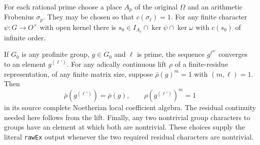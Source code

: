 \begin{proposition}
\label{prop:ax-choices}
For each rational prime choose a place $A_p$ of the original
$\Omega$ and an arithmetic Frobenius $\sigma_p$.  They may be
chosen so that $c(\sigma_\ell)=1$.  For any finite character
$\psi:G\to O^\times$ with open kernel there is
$s_0\in I_{A_\ell}\cap\ker\psi\cap\ker\omega$
with $c(s_0)$ of infinite order.

If $G_0$ is any profinite group, $g\in G_0$ and $\ell$ is prime,
the sequence $g^{\ell^{n!}}$ converges to an element $g^{(\ell')}$.
For any adically continuous lift $\rho$ of a finite-residue
representation, of any finite matrix size, suppose
$\bar\rho(g)^m=1$ with $(m,\ell)=1$.  Then
\[
 \bar\rho(g^{(\ell')})=\bar\rho(g),
 \qquad \rho(g^{(\ell')})^m=1
 \tag{AX.12}
\]
in its source complete Noetherian local coefficient algebra.
The residual continuity needed here follows from the lift.
Finally, any two nontrivial group
characters to groups have an element at which both are nontrivial.
These choices supply the literal \texttt{rawEx} output whenever
the two required residual characters are nontrivial.
\end{proposition}

